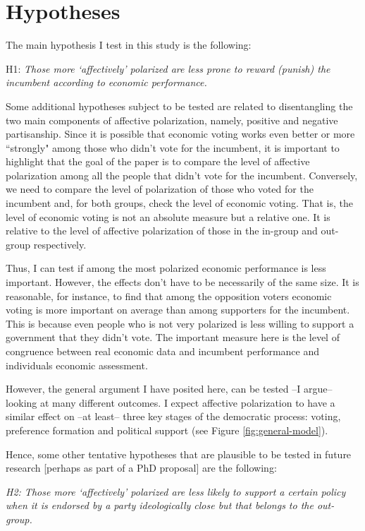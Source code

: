 \documentclass[a4paper, svgnames]{article}
\begin{document}
\section{Hypotheses}

The main hypothesis I test in this study is the following:

H1: \textit{Those more `affectively' polarized are less prone to reward (punish) the incumbent according to economic performance.}

Some additional hypotheses subject to be tested are related to disentangling the two main components of affective polarization, namely, positive and negative partisanship. Since it is possible that economic voting works even better or more ``strongly" among those who didn't vote for the incumbent, it is important to highlight that the goal of the paper is to compare the level of affective polarization among all the people that didn't vote for the incumbent. Conversely, we need to compare the level of polarization of those who voted for the incumbent and, for both groups, check the level of economic voting. That is, the level of economic voting is not an absolute measure but a relative one. It is relative to the level of affective polarization of those in the in-group and out-group respectively.

Thus, I can test if among the most polarized economic performance is less important. However, the effects don't have to be necessarily of the same size. It is reasonable, for instance, to find that among the opposition voters economic voting is more important on average than among supporters for the incumbent. This is because even people who is not very polarized is less willing to support a government that they didn't vote. The important measure here is the level of congruence between real economic data and incumbent performance and individuals economic assessment. 

However, the general argument I have posited here, can be tested --I argue-- looking at many different outcomes. I expect affective polarization to have a similar effect on --at least-- three key stages of the democratic process: voting, preference formation and political support (see Figure \ref{fig:general-model}). 

Hence, some other tentative hypotheses that are plausible to be tested in future research [perhaps as part of a PhD proposal] are the following:

\textit{H2: Those more `affectively' polarized are less likely to support a certain policy when it is endorsed by a party ideologically close but that belongs to the out-group.}
\end{document}
